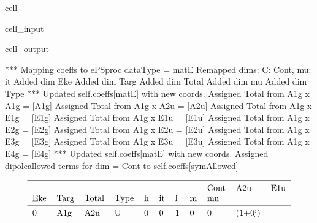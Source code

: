 \documentclass[letterpaper,table,10pt,english]{jupyterBook}
\begin{document}
\begin{sphinxuseclass}{cell}
\begin{sphinxVerbatimInput}
\begin{sphinxuseclass}{cell_input}
\begin{sphinxVerbatim}[commandchars=\\\{\}]
\PYG{p}{[}\PYG{p}{]}\PYG{p}{[}\PYG{p}{]}
\end{sphinxVerbatim}

\end{sphinxuseclass}\end{sphinxVerbatimInput}
\begin{sphinxVerbatimOutput}

\begin{sphinxuseclass}{cell_output}
\begin{sphinxVerbatim}[commandchars=\\\{\}]
*** Mapping coeffs to ePSproc dataType = matE
Remapped dims: \PYGZob{}\PYGZsq{}C\PYGZsq{}: \PYGZsq{}Cont\PYGZsq{}, \PYGZsq{}mu\PYGZsq{}: \PYGZsq{}it\PYGZsq{}\PYGZcb{}
Added dim Eke
Added dim Targ
Added dim Total
Added dim mu
Added dim Type
*** Updated self.coeffs[\PYGZsq{}matE\PYGZsq{}] with new coords.
Assigned \PYGZsq{}Total\PYGZsq{} from A1g x A1g = [\PYGZsq{}A1g\PYGZsq{}]
Assigned \PYGZsq{}Total\PYGZsq{} from A1g x A2u = [\PYGZsq{}A2u\PYGZsq{}]
Assigned \PYGZsq{}Total\PYGZsq{} from A1g x E1g = [\PYGZsq{}E1g\PYGZsq{}]
Assigned \PYGZsq{}Total\PYGZsq{} from A1g x E1u = [\PYGZsq{}E1u\PYGZsq{}]
Assigned \PYGZsq{}Total\PYGZsq{} from A1g x E2g = [\PYGZsq{}E2g\PYGZsq{}]
Assigned \PYGZsq{}Total\PYGZsq{} from A1g x E2u = [\PYGZsq{}E2u\PYGZsq{}]
Assigned \PYGZsq{}Total\PYGZsq{} from A1g x E3g = [\PYGZsq{}E3g\PYGZsq{}]
Assigned \PYGZsq{}Total\PYGZsq{} from A1g x E3u = [\PYGZsq{}E3u\PYGZsq{}]
Assigned \PYGZsq{}Total\PYGZsq{} from A1g x E4g = [\PYGZsq{}E4g\PYGZsq{}]
*** Updated self.coeffs[\PYGZsq{}matE\PYGZsq{}] with new coords.
Assigned dipole\PYGZhy{}allowed terms for dim = \PYGZsq{}Cont\PYGZsq{} to self.coeffs[\PYGZsq{}symAllowed\PYGZsq{}]
\end{sphinxVerbatim}
\begin{equation*}
\begin{split}\begin{tabular}{lllllllllll}
\toprule
  &     &     &   &   &   &   &    & Cont &     A2u &                       E1u \\
Eke & Targ & Total & Type & h & it & l & m & mu &         &                           \\
\midrule
0 & A1g & A2u & U & 0 & 0 & 1 &  0 &  0 &  (1+0j) &                           \\

\end{tabular}
\end{split}
\end{equation*}
\end{sphinxuseclass}
\end{sphinxVerbatimOutput}
\end{sphinxuseclass}
\end{document}
